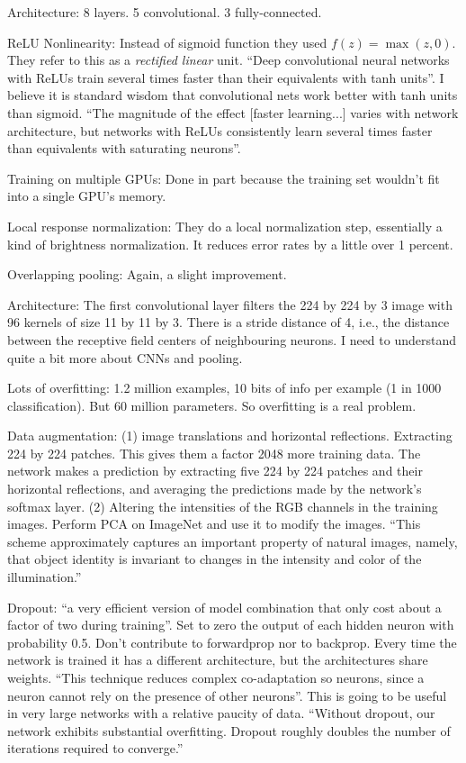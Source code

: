 \documentclass[12pt]{report}
\begin{document}
Architecture: 8 layers.  5 convolutional.  3 fully-connected.

ReLU Nonlinearity: Instead of sigmoid function they used $f(z) =
\max(z, 0)$.  They refer to this as a \emph{rectified linear} unit.
``Deep convolutional neural networks with ReLUs train several times
faster than their equivalents with tanh units''.  I believe it is
standard wisdom that convolutional nets work better with tanh units
than sigmoid.  ``The magnitude of the effect [faster learning...]
varies with network architecture, but networks with ReLUs consistently
learn several times faster than equivalents with saturating neurons''.

Training on multiple GPUs: Done in part because the training set
wouldn't fit into a single GPU's memory.

Local response normalization: They do a local normalization step,
essentially a kind of brightness normalization.  It reduces error
rates by a little over 1 percent.

Overlapping pooling: Again, a slight improvement.

Architecture: The first convolutional layer filters the 224 by 224 by
3 image with 96 kernels of size 11 by 11 by 3.  There is a stride
distance of 4, i.e., the distance between the receptive field centers
of neighbouring neurons.  I need to understand quite a bit more about
CNNs and pooling.

Lots of overfitting: 1.2 million examples, 10 bits of info per example
(1 in 1000 classification).  But 60 million parameters.  So
overfitting is a real problem.

Data augmentation: (1) image translations and horizontal reflections.
Extracting 224 by 224 patches.  This gives them a factor 2048 more
training data.  The network makes a prediction by extracting five 224
by 224 patches and their horizontal reflections, and averaging the
predictions made by the network's softmax layer. (2) Altering the
intensities of the RGB channels in the training images.  Perform PCA
on ImageNet and use it to modify the images.  ``This scheme
approximately captures an important property of natural images,
namely, that object identity is invariant to changes in the intensity
and color of the illumination.'' 

Dropout: ``a very efficient version of model combination that only
cost about a factor of two during training''.  Set to zero the output
of each hidden neuron with probability 0.5.  Don't contribute to
forwardprop nor to backprop.  Every time the network is trained it has
a different architecture, but the architectures share weights.  ``This
technique reduces complex co-adaptation so neurons, since a neuron
cannot rely on the presence of other neurons''.  This is going to be
useful in very large networks with a relative paucity of data.
``Without dropout, our network exhibits substantial overfitting.
Dropout roughly doubles the number of iterations required to
converge.''
\end{document}
